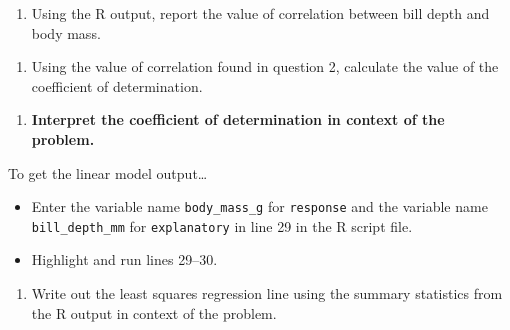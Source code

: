 \documentclass[
]{report}
\newenvironment{Shaded}{\begin{snugshade}}{\end{snugshade}}
\newcommand{\AttributeTok}[1]{\textcolor[rgb]{0.13,0.29,0.53}{#1}}
\newcommand{\CommentTok}[1]{\textcolor[rgb]{0.56,0.35,0.01}{\textit{#1}}}
\newcommand{\FunctionTok}[1]{\textcolor[rgb]{0.13,0.29,0.53}{\textbf{#1}}}
\newcommand{\NormalTok}[1]{#1}
\newcommand{\OtherTok}[1]{\textcolor[rgb]{0.56,0.35,0.01}{#1}}
\newcommand{\SpecialCharTok}[1]{\textcolor[rgb]{0.81,0.36,0.00}{\textbf{#1}}}
\providecommand{\tightlist}{%
  \setlength{\itemsep}{0pt}\setlength{\parskip}{0pt}}
\begin{document}
\begin{enumerate}
\def\labelenumi{\arabic{enumi}.}
\setcounter{enumi}{1}
\tightlist
\item
  Using the R output, report the value of correlation between bill depth and body mass.
\end{enumerate}

\vspace{0.5in}

\begin{enumerate}
\def\labelenumi{\arabic{enumi}.}
\setcounter{enumi}{2}
\tightlist
\item
  Using the value of correlation found in question 2, calculate the value of the coefficient of determination.
\end{enumerate}

\vspace{0.5in}

\begin{enumerate}
\def\labelenumi{\arabic{enumi}.}
\setcounter{enumi}{3}
\tightlist
\item
  \textbf{Interpret the coefficient of determination in context of the problem.}
\end{enumerate}

\vspace{0.8in}

To get the linear model output\ldots{}

\begin{itemize}
\item
  Enter the variable name \texttt{body\_mass\_g} for \texttt{response} and the variable name \texttt{bill\_depth\_mm} for \texttt{explanatory} in line 29 in the R script file.
\item
  Highlight and run lines 29--30.
\end{itemize}

\begin{Shaded}
\end{Shaded}

\begin{enumerate}
\def\labelenumi{\arabic{enumi}.}
\setcounter{enumi}{4}
\tightlist
\item
  Write out the least squares regression line using the summary statistics from the R output in context of the problem.
\end{enumerate}
\end{document}
